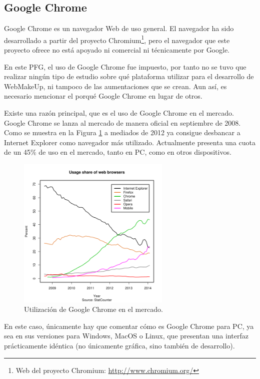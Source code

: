 \subsection{Google Chrome}
\label{sec:PSM-GoogleChrome}
Google Chrome es un navegador Web de uso general. El navegador ha sido desarrollado a partir del proyecto Chromium\footnote{Web del proyecto Chromium: \url{http://www.chromium.org/}}, pero el navegador que este proyecto ofrece no está apoyado ni comercial ni técnicamente por Google.

En este PFG, el uso de Google Chrome fue impuesto, por tanto no se tuvo que realizar ningún tipo de estudio sobre qué plataforma utilizar para el desarrollo de WebMakeUp, ni tampoco de las aumentaciones que se crean. Aun así, es necesario mencionar el porqué Google Chrome en lugar de otros. 

Existe una razón principal, que es el uso de Google Chrome en el mercado. Google Chrome se lanza al mercado de manera oficial en septiembre de 2008. Como se muestra en la Figura \ref{fig:UsoGoogleChrome} a mediados de 2012 ya consigue desbancar a Internet Explorer como navegador más utilizado. Actualmente presenta una cuota de un 45\% de uso en el mercado, tanto en PC, como en otros dispositivos.

\begin{figure}
\begin{center}
\includegraphics[width=0.65\textwidth]{figs/5-UsoGoogleChrome.png}
\caption{Utilización de Google Chrome en el mercado.}
\label{fig:UsoGoogleChrome}
\end{center}
\end{figure}

En este caso, únicamente hay que comentar cómo es Google Chrome para PC, ya sea en sus versiones para Windows, MacOS o Linux, que presentan una interfaz prácticamente idéntica (no únicamente gráfica, sino también de desarrollo).

